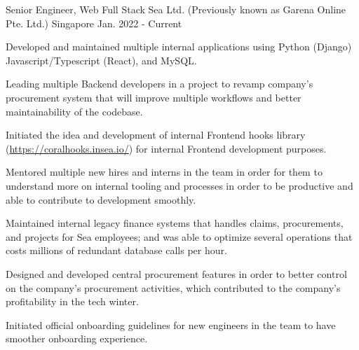 

\begin{cventries}

  \cventry
    {Senior Engineer, Web Full Stack} %
    {Sea Ltd. (Previously known as Garena Online Pte. Ltd.)} %
    {Singapore} %
    {Jan. 2022 - Current} %
    {
      \begin{cvitems} %
        \item {Developed and maintained multiple internal applications using Python (Django) Javascript/Typescript (React), and MySQL.}
        \item {Leading multiple Backend developers in a project to revamp company's procurement system that will improve multiple workflows and better maintainability of the codebase.}
        \item {Initiated the idea and development of internal Frontend hooks library (\url{https://coralhooks.insea.io/}) for internal Frontend development purposes.}
        \item {Mentored multiple new hires and interns in the team in order for them to understand more on internal tooling and processes in order to be productive and able to contribute to development smoothly.}
        \item {Maintained internal legacy finance systems that handles claims, procurements, and projects for Sea employees; and was able to optimize several operations that costs millions of redundant database calls per hour.}
        \item {Designed and developed central procurement features in order to better control on the company's procurement activities, which contributed to the company's profitability in the tech winter.}
        \item {Initiated official onboarding guidelines for new engineers in the team to have smoother onboarding experience.}
      \end{cvitems}
    }


\end{cventries}
